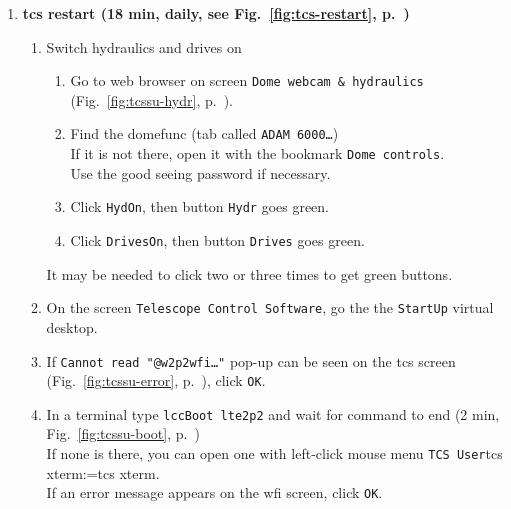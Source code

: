 \documentclass[11pt,fleqn]{book}
\makeatletter
\def\menu#1#2{\texttt{#1}\ifx{}#2\else\@for\@x:=#2\do{$\rightarrow$\texttt{\@x}}\fi}
\def\wmenu#1#2{window menu \menu{#1}{#2}}
\def\mmenu#1#2{left-click mouse menu \menu{#1}{#2}}
\def\fetchob{\wmenu{File}{Load OBs,From file...}}
\def\figref#1{Fig.~\ref{fig:#1}, p.~\pageref{fig:#1}}
\makeatother
\begin{document}
\begin{enumerate}
\begin{enumerate}
          \item In \gls{bob}, execute \texttt{testOB.obd} (1 min)
             \label{list:wfitest}
             \begin{enumerate}
               \item Import it with \fetchob.
               \item Click the \texttt{Start} button. 
             \end{enumerate}
        \end{enumerate}
  \item \textbf{\gls{tcs} restart (18 min, daily, see \figref{tcs-restart})}
        \begin{enumerate}
        \item\label{lab:hydron} Switch hydraulics and drives on
             \begin{enumerate}
               \item Go to web browser on screen \texttt{Dome webcam \& hydraulics} (\figref{tcssu-hydr}). 
               \item Find the \gls{domefunc} (tab called \texttt{ADAM 6000…})\\
                     If it is not there, open it with the bookmark \texttt{Dome controls}.\\
                     Use the good seeing password if necessary.
               \item Click \texttt{HydOn}, then button \texttt{Hydr} goes green.
               \item Click \texttt{DrivesOn}, then button \texttt{Drives} goes green.
             \end{enumerate}
             It may be needed to click two or three times to get green buttons.
             \label{list:hydr}
          \item On the screen \texttt{Telescope Control Software}, go the the \texttt{StartUp} virtual desktop.\label{list:tcs1}
          \item If \texttt{Cannot read "@w2p2wfi…"} pop-up can be seen on the \gls{tcs} screen (\figref{tcssu-error}), click \texttt{OK}.
          \item In a terminal type \texttt{lccBoot \gls{lte2p2}} and wait for command to end (2 min, \figref{tcssu-boot})\\
                If none is there, you can open one with \mmenu{TCS User}{tcs xterm}.\\
                If an error message appears on the \gls{wfi} screen, click \texttt{OK}. 

\end{enumerate}
\end{enumerate}
\end{document}
